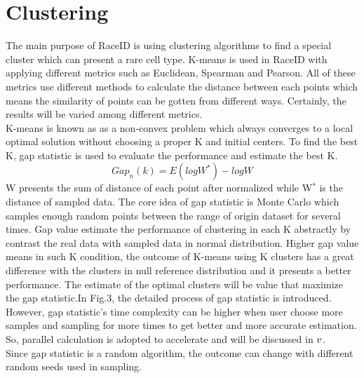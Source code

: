 \documentclass[10pt,journal]{IEEEtran}
\begin{document}
\section{Clustering}
The main purpose of RaceID is using clustering algorithms to find a special cluster which can present a rare cell type. K-means is used in RaceID with applying different metrics such as Euclidean, Spearman and Pearson. All of these metrics use different methods to calculate the distance between each points which means the similarity of points can be gotten from different ways. Certainly, the results will be varied among different metrics.\\
\hspace*{0.2 cm} K-means is known as as a  non-convex problem which  always converges to a local optimal solution without choosing a proper K and initial centers. To find the best K, gap statistic is used to evaluate the performance and estimate the best K.\[Gap_n(k)=E(logW^*)-logW\]
W presents the sum of distance of each point  after normalized while W\(^*\) is the distance of sampled data. The core idea of gap statistic is Monte Carlo which samples enough random points between the range of origin dataset for several times.  Gap value estimate the performance of clustering in each K abstractly by contrast the real data with sampled data in normal distribution. Higher gap value means in such K condition, the outcome of K-means using K clusters has a great difference with the clusters in null reference distribution and it presents a better performance. The estimate of the optimal clusters will be value that maximize the gap statistic.In Fig.3, the detailed process of  gap statistic is introduced.\\
\hspace*{0.2 cm} However, gap statistic's time complexity can be higher when user choose more samples and sampling for more times to get better and more accurate estimation. So, parallel calculation is adopted to accelerate and will be discussed in \(\uppercase\expandafter{\romannumeral5}\).\\
\hspace*{0.2 cm} Since gap statistic is a random algorithm, the outcome can change with different random seeds used in sampling.
\end{document}
